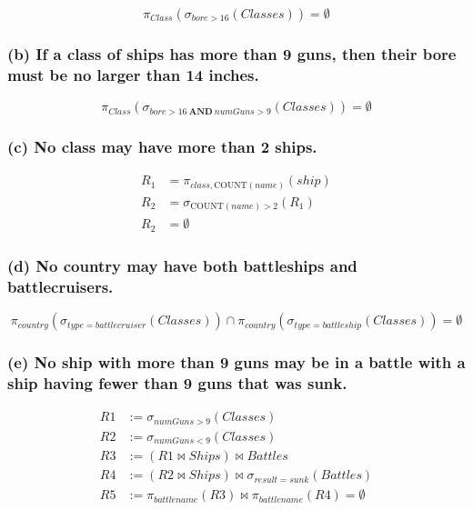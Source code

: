 \documentclass{cshwk}
\begin{document}
\[
    \pi_{Class}(\sigma_{bore > 16}(Classes))= \emptyset
\]

\subsubsection*{(b) If a class of ships has more than 9 guns, then their bore must be no larger than 14 inches.}

\[
    \pi_{Class}(\sigma_{bore > 16\ \mathbf{AND} \ numGuns > 9}(Classes))= \emptyset
\]

\subsubsection*{(c) No class may have more than 2 ships.}

\begin{align*}
    R_1 & = \pi_{class, \text{COUNT}(name)}(ship) \\
    R_2 & = \sigma_{\text{COUNT}(name) > 2}(R_1)  \\
    R_2 & = \emptyset
\end{align*}

\subsubsection*{(d) No country may have both battleships and battlecruisers.}

\[
    \pi_{country}(\sigma_{type=battlecruiser}(Classes))\cap \pi_{country}(\sigma_{type=battleship}(Classes))= \emptyset
\]

\subsubsection*{(e) No ship with more than 9 guns may be in a battle with a ship having fewer than 9 guns that was sunk.}
    
\begin{align*}
    R1 & := \sigma_{numGuns > 9}(Classes)      \\
    R2 & := \sigma_{numGuns < 9}(Classes)      \\
    R3 & := (R1 \bowtie Ships) \bowtie Battles \\
    R4 & := (R2 \bowtie Ships) \bowtie
    \sigma_{result=sunk}(Battles)              \\
    R5 & := \pi_{battlename}(R3) \bowtie
    \pi_{battlename}(R4) = \emptyset
\end{align*}
\end{document}
